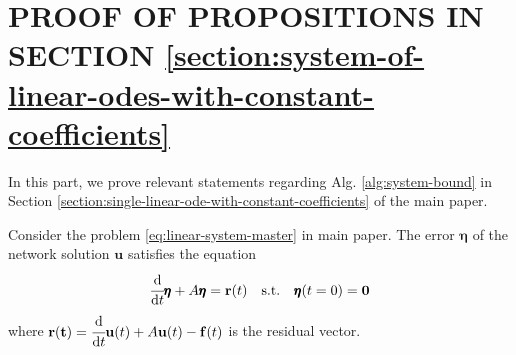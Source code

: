 \documentclass[]{uai2023}
\newcommand{\vect}[1]{\mathbf{#1}}
\newcommand{\dt}[1]{\cfrac{\mathrm{d} #1}{\mathrm{d} t}}
\newcommand{\Err}{\eta}
\begin{document}
\section{PROOF OF PROPOSITIONS IN SECTION \ref{section:system-of-linear-odes-with-constant-coefficients}}
    In this part, we prove relevant statements regarding Alg. \ref{alg:system-bound} in Section \ref{section:single-linear-ode-with-constant-coefficients} of the main paper.

    Consider the problem \ref{eq:linear-system-master} in main paper. 
    The error $\pmb{\Err}$ of the network solution $\vect{u}$ satisfies the equation
    \begin{equation}\label{eq:system-err-equation}
        \dt{} \pmb{\Err} + A\pmb{\Err} = \vect{r}(t) \quad \text{s.t.} \quad \pmb{\Err}(t=0) = \vect{0}
    \end{equation}
    where $\vect{r(t)} = \dt{}\vect{u}(t) + A\vect{u}(t) - \vect{f}(t)$ is the residual vector.
\end{document}
